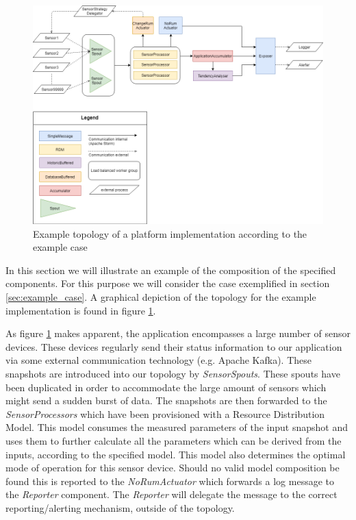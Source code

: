 \begin{figure}
\centering
\includegraphics[width=\textwidth]{resources/img/example_topology.png}
\caption{Example topology of a platform implementation according to the example case}
\label{fig:example_topology}
\end{figure}

In this section we will illustrate an example of the composition of the specified components. For this purpose we will consider the case exemplified in section \ref{sec:example_case}. A graphical depiction of the topology for the example implementation is found in figure \ref{fig:example_topology}. 

As figure \ref{fig:example_topology} makes apparent, the application encompasses a large number of sensor devices. These devices regularly send their status information to our application via some external communication technology (e.g. Apache Kafka). These snapshots are introduced into our topology by \emph{SensorSpouts}. These spouts have been duplicated in order to accommodate the large amount of sensors which might send a sudden burst of data. The snapshots are then forwarded to the \emph{SensorProcessors} which have been provisioned with a Resource Distribution Model. This model consumes the measured parameters of the input snapshot and uses them to further calculate all the parameters which can be derived from the inputs, according to the specified model. This model also determines the optimal mode of operation for this sensor device. Should no valid model composition be found this is reported to the \emph{NoRumActuator} which forwards a log message to the \emph{Reporter} component. The \emph{Reporter} will delegate the message to the correct reporting/alerting mechanism, outside of the topology. 

